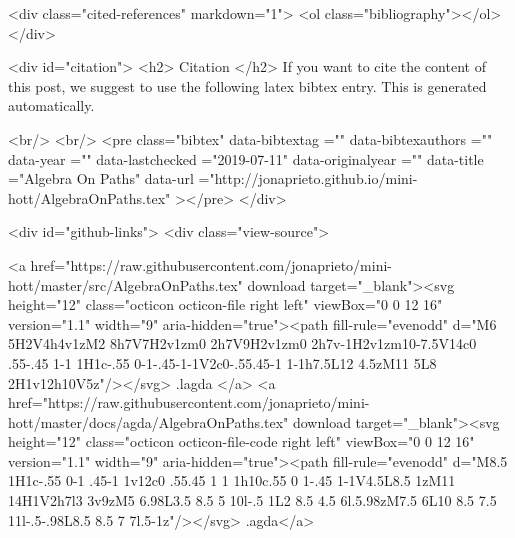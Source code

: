   <div class="cited-references" markdown="1">
  <ol class="bibliography"></ol>
  </div>


  
  <div id="citation">
  <h2> Citation </h2>
  If you want to cite the content of this post,
  we suggest to use the following latex bibtex entry.
  This is generated automatically.

  <br/>
  <br/>
  <pre class="bibtex"
       data-bibtextag =""
       data-bibtexauthors =""
       data-year =""
       data-lastchecked ="2019-07-11"
       data-originalyear =""
       data-title ="Algebra On Paths"
       data-url ="http://jonaprieto.github.io/mini-hott/AlgebraOnPaths.tex"
  ></pre>
  </div>
  

  <div id="github-links">
    <div class="view-source">
      
        <a href="https://raw.githubusercontent.com/jonaprieto/mini-hott/master/src/AlgebraOnPaths.tex" download target="_blank"><svg height="12" class="octicon octicon-file right left" viewBox="0 0 12 16" version="1.1" width="9" aria-hidden="true"><path fill-rule="evenodd" d="M6 5H2V4h4v1zM2 8h7V7H2v1zm0 2h7V9H2v1zm0 2h7v-1H2v1zm10-7.5V14c0 .55-.45 1-1 1H1c-.55 0-1-.45-1-1V2c0-.55.45-1 1-1h7.5L12 4.5zM11 5L8 2H1v12h10V5z"/></svg> .lagda </a>
        <a href="https://raw.githubusercontent.com/jonaprieto/mini-hott/master/docs/agda/AlgebraOnPaths.tex" download target="_blank"><svg height="12" class="octicon octicon-file-code right left" viewBox="0 0 12 16" version="1.1" width="9" aria-hidden="true"><path fill-rule="evenodd" d="M8.5 1H1c-.55 0-1 .45-1 1v12c0 .55.45 1 1 1h10c.55 0 1-.45 1-1V4.5L8.5 1zM11 14H1V2h7l3 3v9zM5 6.98L3.5 8.5 5 10l-.5 1L2 8.5 4.5 6l.5.98zM7.5 6L10 8.5 7.5 11l-.5-.98L8.5 8.5 7 7l.5-1z"/></svg> .agda</a>
      
